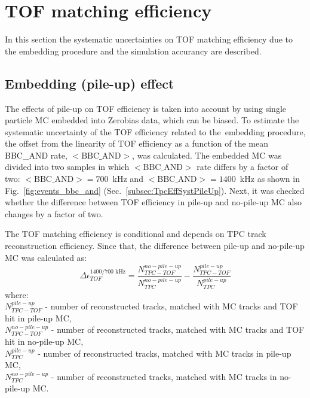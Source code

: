 \section{TOF matching efficiency}\label{sec:tofSystematics}
In this section the systematic uncertainties on TOF matching efficiency due to the embedding procedure and the simulation accurancy are described.
\subsection{Embedding (pile-up) effect}\label{sec:tofSystematicsPileUpEffect}
The effects of pile-up on TOF efficiency is taken into account by using single particle MC embedded into Zerobias data, which can be biased. To estimate the systematic uncertainty of the TOF efficiency related to the~embedding procedure, the offset from the linearity of TOF efficiency  as a function of the mean BBC\_AND rate, $<\text{BBC\_AND}>$, was calculated. The embedded MC was divided into two samples in which $<\text{BBC\_AND}>$ rate differs by a factor of two: \mbox{$<\text{BBC\_AND}>=700$~kHz} and \mbox{$<\text{BBC\_AND}>=1400$~kHz} as shown in Fig.~\ref{fig:events_bbc_and} (Sec.~\ref{subsec:TpcEffSystPileUp}).
Next, it was checked whether the difference between TOF efficiency in pile-up and no-pile-up MC also changes by a factor of two.

\noindent
The TOF matching efficiency is conditional and depends on TPC track reconstruction efficiency. Since that, the difference between pile-up and  no-pile-up MC was calculated as:
\begin{equation}
\Delta\epsilon_{ TOF}^{1400/700\text{ kHz}}=\frac{N_{TPC-TOF}^{no-pile-up}}{N_{TPC}^{no-pile-up}}-\frac{N_{TPC-TOF}^{pile-up}}{N_{TPC}^{pile-up}}
\label{eq:tofSyst}
\end{equation}
where:\\
$N_{TPC-TOF}^{pile-up}$ - number of reconstructed tracks, matched with MC tracks and TOF hit in pile-up MC,\\
$N_{TPC-TOF}^{no-pile-up}$ - number of reconstructed tracks, matched with MC tracks and TOF hit in no-pile-up MC,\\
$N_{TPC}^{pile-up}$ - number of reconstructed tracks, matched with MC tracks in pile-up MC,\\
$N_{TPC}^{no-pile-up}$ - number of reconstructed tracks, matched with MC tracks in no-pile-up MC.
\newline

